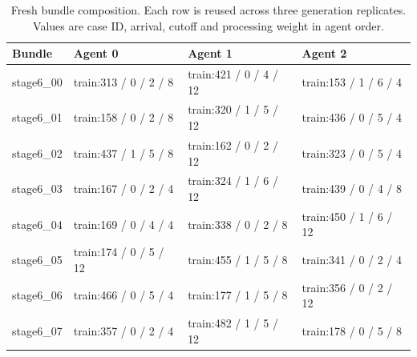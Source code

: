 \begin{table}[t]
\caption{Fresh bundle composition. Each row is reused across three generation replicates. Values are case ID, arrival, cutoff and processing weight in agent order.}
\centering\small
\begin{tabular}{llll}
\toprule
Bundle & Agent 0 & Agent 1 & Agent 2 \\
\midrule
stage6\_00 & train:313 / 0 / 2 / 8 & train:421 / 0 / 4 / 12 & train:153 / 1 / 6 / 4 \\
stage6\_01 & train:158 / 0 / 2 / 8 & train:320 / 1 / 5 / 12 & train:436 / 0 / 5 / 4 \\
stage6\_02 & train:437 / 1 / 5 / 8 & train:162 / 0 / 2 / 12 & train:323 / 0 / 5 / 4 \\
stage6\_03 & train:167 / 0 / 2 / 4 & train:324 / 1 / 6 / 12 & train:439 / 0 / 4 / 8 \\
stage6\_04 & train:169 / 0 / 4 / 4 & train:338 / 0 / 2 / 8 & train:450 / 1 / 6 / 12 \\
stage6\_05 & train:174 / 0 / 5 / 12 & train:455 / 1 / 5 / 8 & train:341 / 0 / 2 / 4 \\
stage6\_06 & train:466 / 0 / 5 / 4 & train:177 / 1 / 5 / 8 & train:356 / 0 / 2 / 12 \\
stage6\_07 & train:357 / 0 / 2 / 4 & train:482 / 1 / 5 / 12 & train:178 / 0 / 5 / 8 \\
\bottomrule
\end{tabular}
\end{table}
